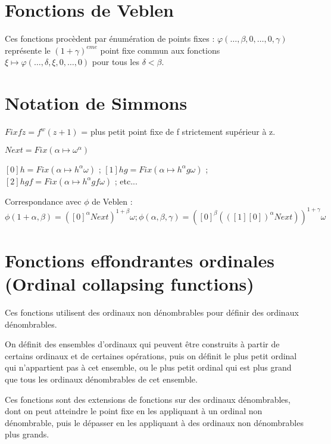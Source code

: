 \documentclass[8pt]{article}
\begin{document}
\section{Fonctions de Veblen}
\vspace{-0.4cm}
Ces fonctions procèdent par énumération de points fixes : \(\varphi(\ldots,\beta,0,\ldots,0,\gamma) \) représente le \((1+\gamma)^{eme}\) point fixe commun aux fonctions \( \xi \mapsto \varphi(\ldots,\delta,\xi,0,\ldots,0)\) pour tous les \(\delta < \beta\).
\vspace{-0.6cm}

\section{Notation de Simmons}
\vspace{-0.4cm}
\( Fix f z = f^w(z+1)\) = plus petit point fixe de f strictement supérieur à z.

\( Next = Fix (\alpha \mapsto \omega^\alpha) \)

\( [0] h = Fix (\alpha \mapsto h^\alpha \omega) \) ;
\( [1] h g = Fix (\alpha \mapsto h^\alpha g \omega) \) ;
\( [2] h g f = Fix (\alpha \mapsto h^\alpha g f \omega) \) ; etc...

Correspondance avec \(\phi\) de Veblen : \( \phi(1+\alpha,\beta) = ([0]^\alpha Next)^{1+\beta} \omega ; 
 \phi(\alpha,\beta,\gamma) = ([0]^\beta (([1] [0])^\alpha Next))^{1+\gamma} \omega \)

\vspace{-0.6cm}

\section{Fonctions effondrantes ordinales (Ordinal collapsing functions)}
\vspace{-0.4cm}
Ces fonctions utilisent des ordinaux non dénombrables pour définir des ordinaux dénombrables. 

On définit des ensembles d'ordinaux qui peuvent être construits à partir de certains ordinaux et de certaines opérations, puis on définit le plus petit ordinal qui n'appartient pas à cet ensemble, ou le plus petit ordinal qui est plus grand que tous les ordinaux dénombrables de cet ensemble.

Ces fonctions sont des extensions de fonctions sur des ordinaux dénombrables, dont on peut atteindre le point fixe en les appliquant à un ordinal non dénombrable, puis le dépasser en les appliquant à des ordinaux non dénombrables plus grands.
\end{document}
